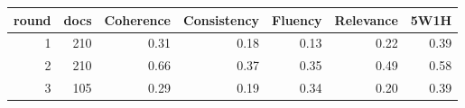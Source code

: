 \begin{tabular}{rrrrrrr}
\toprule
round & docs & Coherence & Consistency & Fluency & Relevance & 5W1H \\
\midrule
1 & 210 & 0.31 & 0.18 & 0.13 & 0.22 & 0.39 \\
2 & 210 & 0.66 & 0.37 & 0.35 & 0.49 & 0.58 \\
3 & 105 & 0.29 & 0.19 & 0.34 & 0.20 & 0.39 \\
\bottomrule
\end{tabular}
